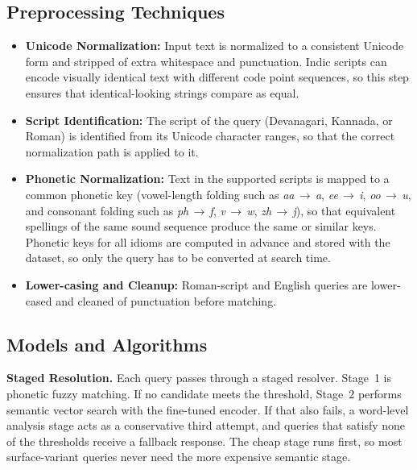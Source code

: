 \documentclass[12pt,a4paper]{article}
\begin{document}
\subsection{Preprocessing Techniques}
\begin{itemize}
  \item \textbf{Unicode Normalization:} Input text is normalized to a consistent Unicode form and stripped of extra whitespace and punctuation. Indic scripts can encode visually identical text with different code point sequences, so this step ensures that identical-looking strings compare as equal.
  \item \textbf{Script Identification:} The script of the query (Devanagari, Kannada, or Roman) is identified from its Unicode character ranges, so that the correct normalization path is applied to it.
  \item \textbf{Phonetic Normalization:} Text in the supported scripts is mapped to a common phonetic key (vowel-length folding such as \emph{aa}\,$\to$\,\emph{a}, \emph{ee}\,$\to$\,\emph{i}, \emph{oo}\,$\to$\,\emph{u}, and consonant folding such as \emph{ph}\,$\to$\,\emph{f}, \emph{v}\,$\to$\,\emph{w}, \emph{zh}\,$\to$\,\emph{j}), so that equivalent spellings of the same sound sequence produce the same or similar keys. Phonetic keys for all idioms are computed in advance and stored with the dataset, so only the query has to be converted at search time.
  \item \textbf{Lower-casing and Cleanup:} Roman-script and English queries are lower-cased and cleaned of punctuation before matching.
\end{itemize}

\subsection{Models and Algorithms}

\textbf{Staged Resolution.} Each query passes through a staged resolver. Stage~1 is phonetic fuzzy matching. If no candidate meets the threshold, Stage~2 performs semantic vector search with the fine-tuned encoder. If that also fails, a word-level analysis stage acts as a conservative third attempt, and queries that satisfy none of the thresholds receive a fallback response. The cheap stage runs first, so most surface-variant queries never need the more expensive semantic stage.
\end{document}
